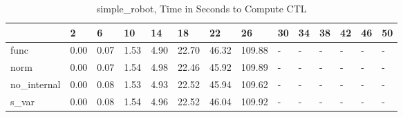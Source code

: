 \begin{table}
\caption{simple_robot, Time in Seconds to Compute CTL}
\label{simple_robot_CTL_time}
\begin{tabular}{llllllllllllll}
\toprule
 & 2 & 6 & 10 & 14 & 18 & 22 & 26 & 30 & 34 & 38 & 42 & 46 & 50 \\
\midrule
func & 0.00 & 0.07 & 1.53 & 4.90 & 22.70 & 46.32 & 109.88 & - & - & - & - & - & - \\
norm & 0.00 & 0.07 & 1.54 & 4.98 & 22.46 & 45.92 & 109.89 & - & - & - & - & - & - \\
no_internal & 0.00 & 0.08 & 1.53 & 4.93 & 22.52 & 45.94 & 109.62 & - & - & - & - & - & - \\
s_var & 0.00 & 0.08 & 1.54 & 4.96 & 22.52 & 46.04 & 109.92 & - & - & - & - & - & - \\
\bottomrule
\end{tabular}
\end{table}
